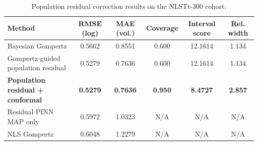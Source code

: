 \begin{table}[t]
\centering
\caption{Population residual correction results on the NLSTt-300 cohort.}
\begin{tabular}{lccccc}
\toprule
Method & RMSE (log) & MAE (vol.) & Coverage & Interval score & Rel. width \\
\midrule
Bayesian Gompertz & 0.5662 & 0.8551 & 0.600 & 12.1614 & 1.134 \\
Gompertz-guided population residual & 0.5279 & 0.7636 & 0.600 & 12.1614 & 1.134 \\
\textbf{Population residual + conformal} & \textbf{0.5279} & \textbf{0.7636} & \textbf{0.950} & \textbf{8.4727} & \textbf{2.857} \\
Residual PINN MAP only & 0.5972 & 1.0323 & N/A & N/A & N/A \\
NLS Gompertz & 0.6048 & 1.2279 & N/A & N/A & N/A \\
\bottomrule
\end{tabular}
\end{table}
